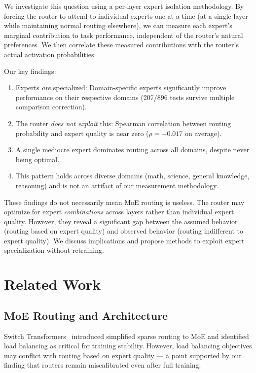 \documentclass[11pt,a4paper]{article}
\begin{document}
We investigate this question using a per-layer expert isolation methodology. By forcing the router to attend to individual experts one at a time (at a single layer while maintaining normal routing elsewhere), we can measure each expert's marginal contribution to task performance, independent of the router's natural preferences. We then correlate these measured contributions with the router's actual activation probabilities.

Our key findings:
\begin{enumerate}
\item Experts \textit{are} specialized: Domain-specific experts significantly improve performance on their respective domains (207/896 tests survive multiple comparison correction).
\item The router \textit{does not exploit} this: Spearman correlation between routing probability and expert quality is near zero ($\rho = -0.017$ on average).
\item A single mediocre expert dominates routing across all domains, despite never being optimal.
\item This pattern holds across diverse domains (math, science, general knowledge, reasoning) and is not an artifact of our measurement methodology.
\end{enumerate}

These findings do not necessarily mean MoE routing is useless. The router may optimize for expert \textit{combinations} across layers rather than individual expert quality. However, they reveal a significant gap between the assumed behavior (routing based on expert quality) and observed behavior (routing indifferent to expert quality). We discuss implications and propose methods to exploit expert specialization without retraining.

\section{Related Work}

\subsection{MoE Routing and Architecture}

Switch Transformers~\citep{Fedus2022SwitchTransformers} introduced simplified sparse routing to MoE and identified load balancing as critical for training stability. However, load balancing objectives may conflict with routing based on expert quality --- a point supported by our finding that routers remain miscalibrated even after full training.
\end{document}
